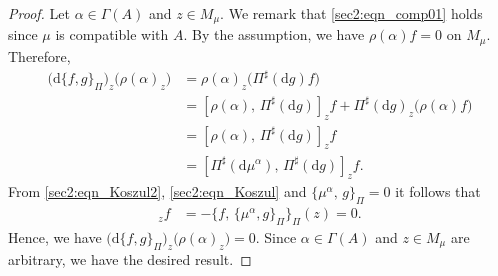 \documentclass[a4paper,11pt,dvipdfmx]{article}
\numberwithin{equation}{section}
\begin{document}
\begin{proof}
Let $\alpha\in \varGamma(A)$ and $z\in M_{\mu}$. 
We remark that \eqref{sec2:eqn_comp01} holds since $\mu$ is compatible with $A$.
By the assumption, we have $\rho(\alpha)f=0$ on $M_{\mu}$. Therefore, 
\begin{align*}
\bigl(\mathrm{d}\{f,g\}_{\Pi}\bigr)_z\bigl(\rho(\alpha)_z\bigr)&= \rho(\alpha)_z\bigl(\Pi^{\sharp}(\mathrm{d}g)f\bigr) \\
&= [\rho(\alpha),\,\Pi^{\sharp}(\mathrm{d}g)]_zf + \Pi^{\sharp}(\mathrm{d}g)_z\bigl(\rho(\alpha)f\bigr) \\
&= [\rho(\alpha),\,\Pi^{\sharp}(\mathrm{d}g)]_zf \\
&= [\Pi^{\sharp}(\mathrm{d}\mu^{\alpha}),\,\Pi^{\sharp}(\mathrm{d}g)]_zf. 
\end{align*}
From \eqref{sec2:eqn_Koszul2}, \eqref{sec2:eqn_Koszul} and $\{\mu^{\alpha},\,g\}_{\Pi}=0$ it follows that  
\begin{align*}
 [\Pi^{\sharp}(\mathrm{d}\mu^{\alpha}),\,\Pi^{\sharp}(\mathrm{d}g)]_zf &= -\bigl\{f,\,\{\mu^{\alpha},g\}_{\Pi}\bigr\}_{\Pi}(z)=0. 
\end{align*}
Hence, we have $\bigl(\mathrm{d}\{f,g\}_{\Pi}\bigr)_z\bigl(\rho(\alpha)_z\bigr)=0$. Since $\alpha\in \varGamma(A)$ and $z\in M_{\mu}$ are arbitrary, we have the desired result. 
\end{proof}
\end{document}
